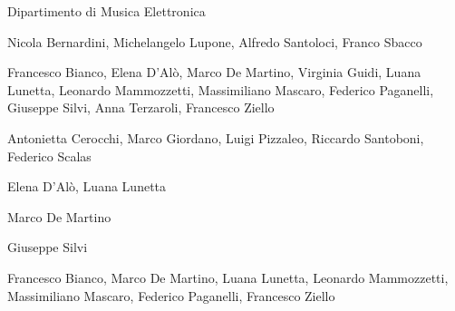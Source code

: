 

%
%
	
{\fontsize{24}{22} }

\medskip

{\fontsize{12}{12} \textsf{Dipartimento di Musica Elettronica}}

\vspace{.5cm}

\textbf{}

Nicola Bernardini, Michelangelo Lupone, Alfredo Santoloci, Franco Sbacco

\medskip

\textbf{}

Francesco Bianco, Elena D’Alò, Marco De Martino, Virginia Guidi, Luana Lunetta, Leonardo Mammozzetti, Massimiliano Mascaro, Federico Paganelli, Giuseppe Silvi, Anna Terzaroli, Francesco Ziello  

\medskip

\textbf{}

Antonietta Cerocchi, Marco Giordano, Luigi Pizzaleo, Riccardo Santoboni, Federico Scalas

\medskip

\textbf{}

Elena D’Alò, Luana Lunetta

\medskip

\textbf{}

Marco De Martino

\medskip

\textbf{}

Giuseppe Silvi

\medskip

\textbf{}

Francesco Bianco, Marco De Martino, Luana Lunetta, Leonardo Mammozzetti, Massimiliano Mascaro, Federico Paganelli, Francesco Ziello

